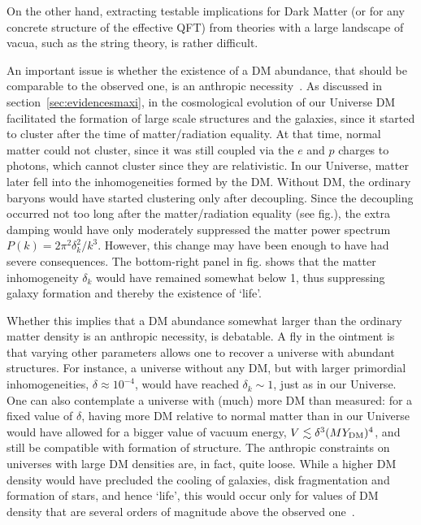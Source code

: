 On the other hand, extracting testable implications for Dark Matter (or for any concrete structure of the effective QFT) from theories with a large landscape of vacua, such as the string theory, is rather difficult. 


An important issue is whether the existence of  a DM abundance, that should be comparable to the observed one,
is an anthropic necessity~\cite{DManthopicabundance}. 
As discussed in section~\ref{sec:evidencesmaxi}, in the cosmological evolution of our Universe DM facilitated the formation of large scale structures and the galaxies, since it started to cluster after the time of matter/radiation equality.
At that time, normal matter could not cluster, since it was still coupled  via the $e$ and $p$ charges to photons, which cannot cluster since they are relativistic.
In our Universe, matter later fell into the  inhomogeneities formed by the DM.
Without DM, the ordinary baryons would have started clustering only after decoupling.
Since the decoupling occurred not too long after the matter/radiation equality (see fig.), 
the extra damping would have only moderately suppressed the matter power spectrum $P(k) = 2\pi^2\delta_k^2/ k^3 $. However, this change may have been enough to have had severe consequences. 
The bottom-right panel in fig. shows that the matter inhomogeneity $\delta_k$ would have remained somewhat below 1, 
thus suppressing galaxy formation and thereby the existence of `life'. 


Whether this implies that a DM abundance somewhat larger than the ordinary matter density is an anthropic necessity, is debatable. 
A fly in the ointment is that varying other parameters allows one to recover a universe with abundant structures. For instance,
a universe without any DM, but with larger primordial inhomogeneities, $\delta \approx 10^{-4}$, would have reached $\delta_k\sim 1$, just as in our Universe. 
One can also contemplate a universe with (much) more DM than measured: for a fixed value of $\delta$, having more DM relative to normal matter than in our Universe would have allowed for a bigger value of vacuum energy, $V \lesssim \delta^3 (M Y_{\rm DM})^4$, and still be compatible with formation of structure.
The anthropic constraints on universes with large DM densities are, in fact, quite loose. 
While a higher DM density would have precluded the cooling of galaxies, disk fragmentation and formation of stars, and hence `life', 
 this would occur only for values of DM density that are several orders of magnitude above the observed one~\cite{DManthopicabundance}. 

